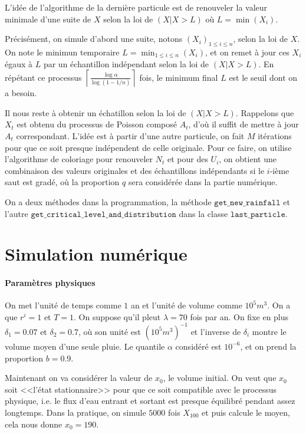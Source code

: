 \documentclass{article}
\begin{document}
L'idée de l'algorithme de la dernière particule est de renouveler la valeur minimale d'une suite de $X$ selon la loi de $(X|X>L)$ où $L=\min(X_i)$. 

Précisément, on simule d'abord une suite, notons $(X_i)_{1\leq i\leq n}$, selon la loi de $X$. On note le minimun temporaire $L=\min_{1\leq i\leq n}(X_i)$, et on remet à jour ces $X_i$ égaux à $L$ par un échantillon indépendant selon la loi de $(X|X>L)$. En répétant ce processus $\displaystyle \left\lceil\frac{\log \alpha}{\log(1-1/n)}\right\rceil$ fois, le minimum final $L$ est le seuil dont on a besoin.

Il nous reste à obtenir un échatillon selon la loi de $(X|X>L)$. Rappelons que $X_t$ est obtenu du processus de Poisson composé $A_t$, d'où il suffit de mettre à jour $A_t$ correspondant. L'idée est à partir d'une autre particule, on fait $M$ itérations pour que ce soit presque indépendent de celle originale. Pour ce faire, on utilise l'algorithme de coloriage pour renouveler $N_t$ et pour des $U_i$, on obtient une combinaison des valeurs originales et des échantillons indépendants si le $i$-ième saut est gradé, où la proportion $q$ sera considérée dans la partie numérique.

On a deux méthodes dans la programmation, la méthode $\texttt{get\_new\_rainfall}$ et l'autre $\texttt{get\_critical\_level\_and\_distribution}$ dans la classe $\texttt{last\_particle}$.

\section{Simulation numérique} 
\paragraph{Paramètres physiques} On met l'unité de temps comme $1$ an et l'unité de volume comme $10^5m^3$. On a que $r^i=1$ et $T=1$. On suppose qu'il pleut $\lambda=70$ fois par an. On fixe en plus $\delta_1=0.07$ et $\delta_2=0.7$, où son unité est $(10^5m^3)^{-1}$ et l'inverse de $\delta_i$ montre le volume moyen d'une seule pluie. Le quantile $\alpha$ considéré est $10^{-6}$, et on prend la proportion $b=0.9$.

Maintenant on va considérer la valeur de $x_0$, le volume initial. On veut que $x_0$ soit <<l'état stationnaire>> pour que ce soit compatible avec le processus physique, i.e. le flux d'eau entrant et sortant est presque équilibré pendant assez longtemps. Dans la pratique, on simule $5000$ fois $X_100$ et puis calcule le moyen, cela nous donne $x_0=190$.
\end{document}
